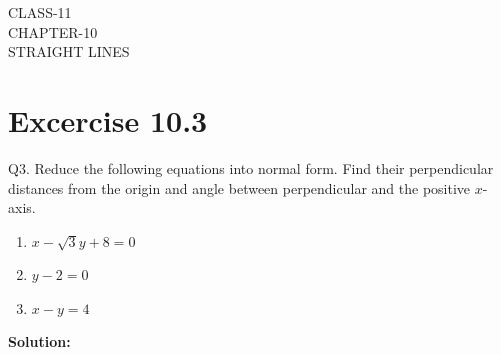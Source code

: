\documentclass[12pt]{article}
\newcommand{\solution}{\noindent \textbf{Solution: }}
\begin{document}
\begin{center}
\textbf\large{CLASS-11 \\ CHAPTER-10 \\ STRAIGHT LINES}
\end{center}
\section*{Excercise 10.3}

Q3. Reduce the following equations into normal form. Find their perpendicular distances from the origin and angle between perpendicular and the positive $x$-axis.
\begin{enumerate}
	\item $x-\sqrt{3}y+8=0$ 
	\item $y-2=0$
	\item $x-y=4$
\end{enumerate}
\solution
\end{document}
